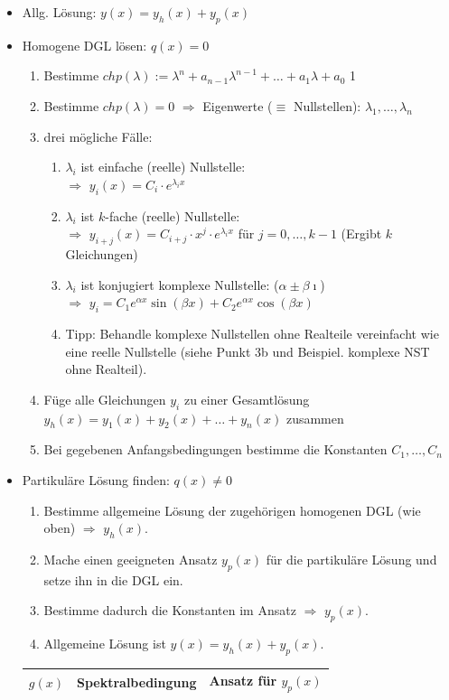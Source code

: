 \documentclass[a4paper]{article}
\begin{document}
		\begin{fmerke}[Lineare DGL mit konstanten Koeffizienten \hspace{6mm} ($y^{(n)}+a_{n-1}y^{(n-1)}+\ldots+a_1 y'+a_0 y = q(x)$)]
			\begin{itemize}
				\item Allg. Lösung: $y(x)=y_h(x)+y_p(x)$
				\item Homogene DGL lösen: $q(x)=0$
				\begin{enumerate}
					\item Bestimme $chp(\lambda):=\lambda^n+a_{n-1}\lambda^{n-1}+\ldots + a_1\lambda+a_0$
1					\item Bestimme $chp(\lambda)=0$ $\Rightarrow$ Eigenwerte ($\equiv$ Nullstellen): $\lambda_1,\ldots,\lambda_n$
					\item drei mögliche Fälle:
					\begin{enumerate}
						\item $\lambda_i$ ist einfache (reelle) Nullstelle: \\ $\Rightarrow$ $y_i(x)=C_i\cdot e^{\lambda_i x}$
						\item $\lambda_i$ ist $k$-fache (reelle) Nullstelle: \\ $\Rightarrow$ $y_{i+j}(x)=C_{i+j}\cdot x^j\cdot e^{\lambda_i x}$ für $j=0,\ldots,k-1$ (Ergibt $k$ Gleichungen)
						\item $\lambda_i$ ist konjugiert komplexe Nullstelle: ($\alpha \pm \beta \imath$) \\ $\Rightarrow$ $y_i=C_1 e^{\alpha x}\sin\left(\beta x\right)+C_2 e^{\alpha x}\cos\left(\beta x\right)$
						\item Tipp: Behandle komplexe Nullstellen ohne Realteile vereinfacht wie eine reelle Nullstelle (siehe Punkt 3b und Beispiel. komplexe NST ohne Realteil).
					\end{enumerate}
					\item Füge alle Gleichungen $y_i$ zu einer Gesamtlösung $y_h(x)=y_1(x)+y_2(x)+\ldots+y_n(x)$ zusammen
					\item Bei gegebenen Anfangsbedingungen bestimme die Konstanten $C_1,\ldots,C_n$
				\end{enumerate}
				\item Partikuläre Lösung finden: $q(x)\neq 0$
				\begin{enumerate}
					\item Bestimme allgemeine Lösung der zugehörigen homogenen DGL (wie oben) $\Rightarrow$ $y_h(x)$.
					\item Mache einen geeigneten Ansatz $y_p(x)$ für die partikuläre Lösung und setze ihn in die DGL ein.
					\item Bestimme dadurch die Konstanten im Ansatz $\Rightarrow$ $y_p(x)$.
					\item Allgemeine Lösung ist $y(x)=y_h(x)+y_p(x)$.
				\end{enumerate}
				\renewcommand{\arraystretch}{1.2}
				\begin{tabular}{p{3cm}|l|p{7cm}}
					$g(x)$ & Spektralbedingung & Ansatz für $y_p(x)$\\ \hline \hline
					

\end{tabular}
\end{itemize}
\end{fmerke}
\end{document}
